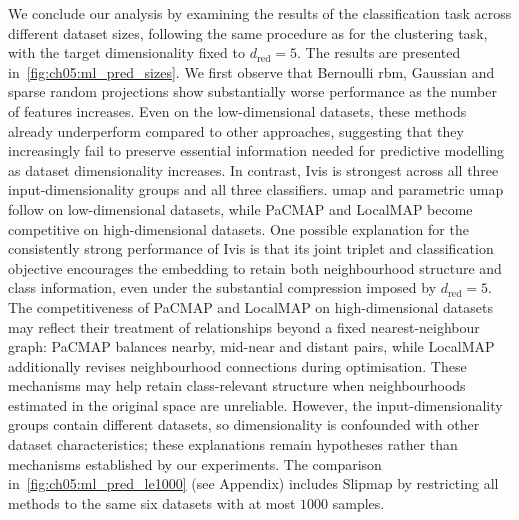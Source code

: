 We conclude our analysis by examining the results of the classification task across different dataset sizes, following the same procedure as for the clustering task, with the target dimensionality fixed to $d_{\mathrm{red}}=5$.
The results are presented in~\cref{fig:ch05:ml_pred_sizes}.
We first observe that Bernoulli \gls{rbm}, Gaussian and sparse random projections show substantially worse performance as the number of features increases. Even on the low-dimensional datasets, these methods already underperform compared to other approaches, suggesting that they increasingly fail to preserve essential information needed for predictive modelling as dataset dimensionality increases.
In contrast, Ivis is strongest across all three input-dimensionality groups and all three classifiers. \gls{umap} and parametric \gls{umap} follow on low-dimensional datasets, while PaCMAP and LocalMAP become competitive on high-dimensional datasets.
One possible explanation for the consistently strong performance of Ivis is that its joint triplet and classification objective encourages the embedding to retain both neighbourhood structure and class information, even under the substantial compression imposed by $d_{\mathrm{red}}=5$. The competitiveness of PaCMAP and LocalMAP on high-dimensional datasets may reflect their treatment of relationships beyond a fixed nearest-neighbour graph: PaCMAP balances nearby, mid-near and distant pairs, while LocalMAP additionally revises neighbourhood connections during optimisation. These mechanisms may help retain class-relevant structure when neighbourhoods estimated in the original space are unreliable. However, the input-dimensionality groups contain different datasets, so dimensionality is confounded with other dataset characteristics; these explanations remain hypotheses rather than mechanisms established by our experiments.
The comparison in~\cref{fig:ch05:ml_pred_le1000} (see Appendix) includes Slipmap by restricting all methods to the same six datasets with at most $1000$ samples.

